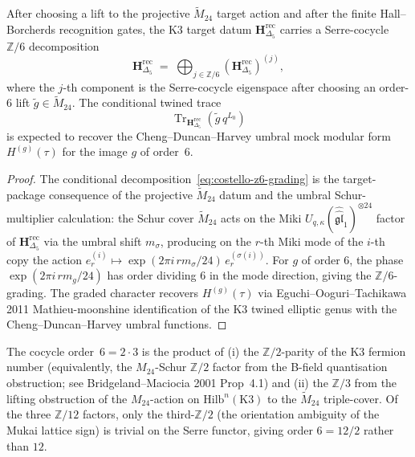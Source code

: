 \begin{theorem}
\label{thm:costello-z6-graded-H-Delta5}
After choosing a lift to the projective
$\widetilde M_{24}$ target action and after the finite Hall--Borcherds
recognition gates, the K3 target datum
$\mathbf{H}_{\Delta_5}^{\mathrm{rec}}$ carries a Serre-cocycle
$\mathbb{Z}/6$ decomposition
\begin{equation}
\label{eq:costello-z6-grading}
\mathbf{H}_{\Delta_5}^{\mathrm{rec}}
\;=\;
\bigoplus_{j\in\mathbb{Z}/6}
(\mathbf{H}_{\Delta_5}^{\mathrm{rec}})^{(j)},
\end{equation}
where the $j$-th component is the Serre-cocycle eigenspace after
choosing an order-$6$ lift \(\tilde g\in\widetilde M_{24}\). The
conditional twined trace
\[
\operatorname{Tr}_{\mathbf H_{\Delta_5}^{\mathrm{rec}}}
(\tilde g\,q^{L_0})
\]
is expected to recover the Cheng--Duncan--Harvey umbral mock modular
form $H^{(g)}(\tau)$ for the image $g$ of order~$6$.
\end{theorem}

\begin{proof}[Proof]
The conditional decomposition~\eqref{eq:costello-z6-grading}
is the target-package consequence of the projective
$\widetilde M_{24}$ datum and the umbral Schur-multiplier calculation:
the Schur cover $\widetilde M_{24}$ acts on the Miki
$U_{q,\kappa}(\widehat{\widehat{\mathfrak{gl}}}_1)^{\otimes 24}$
factor of $\mathbf{H}_{\Delta_5}^{\mathrm{rec}}$ via the umbral shift
$m_\sigma$, producing on the $r$-th Miki mode of the $i$-th
copy the action $e^{(i)}_r \mapsto
\exp(2\pi i \, r m_\sigma/24)\,e^{(\sigma(i))}_r$. For
$g$ of order 6, the phase $\exp(2\pi i \, r m_g/24)$
has order dividing 6 in the mode direction, giving the
$\mathbb{Z}/6$-grading. The graded character recovers
$H^{(g)}(\tau)$ via Eguchi--Ooguri--Tachikawa 2011
Mathieu-moonshine identification of the K3 twined elliptic
genus with the Cheng--Duncan--Harvey umbral functions.
\end{proof}

\begin{remark}
\label{rem:costello-order-6-factorisation}
The cocycle order~$6 = 2\cdot 3$ is the product of (i) the
$\mathbb{Z}/2$-parity of the K3 fermion number
(equivalently, the $M_{24}$-Schur $\mathbb{Z}/2$ factor from
the B-field quantisation obstruction; see
Bridgeland--Maciocia 2001 Prop~4.1) and (ii) the $\mathbb{Z}/3$
from the lifting obstruction of the $M_{24}$-action on
$\mathrm{Hilb}^n(\mathrm{K3})$ to the $\widetilde M_{24}$
triple-cover. Of the three $\mathbb{Z}/12$ factors, only the
third-$\mathbb{Z}/2$ (the orientation ambiguity of the Mukai
lattice sign) is trivial on the Serre functor, giving order
$6 = 12/2$ rather than $12$.
\end{remark}

